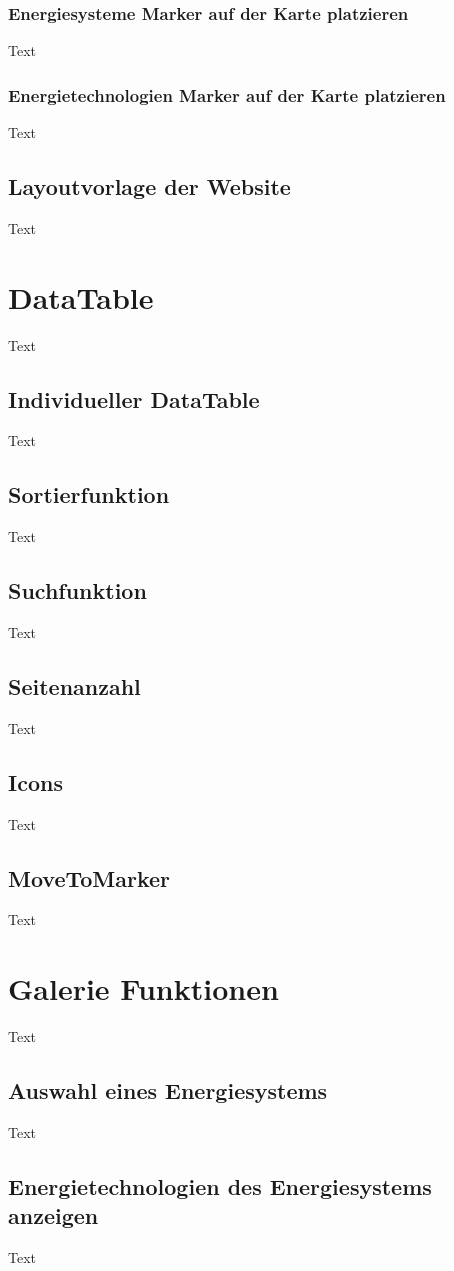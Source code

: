 \subsubsection{Energiesysteme Marker auf der Karte platzieren}
Text
\subsubsection{Energietechnologien Marker auf der Karte platzieren}
Text

\subsection{Layoutvorlage der Website}
Text



\section{DataTable}
Text
\subsection{Individueller DataTable}
Text
\subsection{Sortierfunktion}
Text
\subsection{Suchfunktion}
Text
\subsection{Seitenanzahl}
Text
\subsection{Icons}
Text
\subsection{MoveToMarker}
Text


\section{Galerie Funktionen}
Text
\subsection{Auswahl eines Energiesystems}
Text
\subsection{Energietechnologien des Energiesystems anzeigen}
Text




